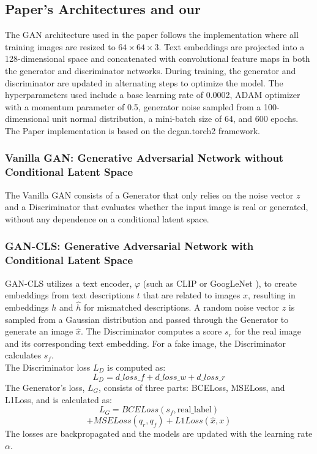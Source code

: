 \subsection*{Paper's Architectures and our}
The GAN architecture used in the paper follows the implementation where all training images are resized 
to $64 \times 64 \times 3$. 
Text embeddings are projected into a 128-dimensional space and concatenated with convolutional feature 
maps in both the generator and discriminator networks. 
During training, the generator and discriminator are updated in alternating steps to optimize the model. 
The hyperparameters used include a base learning rate of 0.0002, ADAM optimizer with a momentum parameter of 0.5, 
generator noise sampled from a 100-dimensional unit normal distribution, a mini-batch size of 64, and 600 epochs. 
The Paper implementation is based on the dcgan.torch2 framework.

\subsubsection*{Vanilla GAN: Generative Adversarial Network without Conditional Latent Space}
The Vanilla GAN consists of a Generator that only relies on the noise vector $z$ and a Discriminator 
that evaluates whether the input image is real or generated, without any dependence on a conditional latent space.

\subsubsection*{GAN-CLS: Generative Adversarial Network with Conditional Latent Space}
GAN-CLS utilizes a text encoder, $\varphi$ (such as CLIP or GoogLeNet ), to create embeddings from text descriptions ${t}$ 
that are related to images ${x}$, resulting in embeddings ${h}$ and $\hat{h}$ 
for mismatched descriptions. 
A random noise vector ${z}$ is sampled from a Gaussian distribution and passed 
through the Generator to generate an image $\hat{x}$. 
The Discriminator computes a score ${s_r}$ for the real image and its corresponding text embedding. 
For a fake image, the Discriminator calculates ${s_f}$.\\ 
The Discriminator loss $L_D$ is computed as:
\[
L_D = d\_loss\_f + d\_loss\_w + d\_loss\_r
\]
The Generator's loss, $L_G$, consists of three parts: BCELoss, MSELoss, and L1Loss, and is calculated as:
\[
L_G = BCELoss(s_f, \text{real\_label}) 
\]
\[
  + MSELoss(q_r, q_f) + L1Loss(\hat{x}, x)
\]
The losses are backpropagated and the models are updated with the learning rate $\alpha$.

